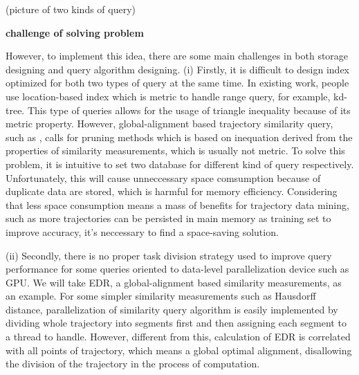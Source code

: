 \documentclass[conference]{IEEEtran}
\begin{document}
		(picture of two kinds of query)
	
	
\textbf{challenge of solving problem}


	
	However, to implement this idea, there are some main challenges in both storage designing and query algorithm designing.
	(i) Firstly, it is difficult to design index optimized for both two types of query at the same time. In existing work, people use location-based index which is metric to handle range query, for example, kd-tree. This type of queries allows for the usage of triangle inequality because of its metric property. However, global-alignment based trajectory similarity query, such as \cite{DBLP:conf/sigmod/ChenOO05}, calls for pruning methods which is based on inequation derived from the properties of similarity measurements, which is usually not metric.
	To solve this problem, it is intuitive to set two database for different kind of query respectively. Unfortunately, this will cause unneccessary space comsumption because of duplicate data are stored, which is harmful for memory efficiency. Considering that less space consumption means a mass of benefits for trajectory data mining, such as more trajectories can be persisted in main memory as training set to improve accuracy, it's neccessary to find a space-saving solution.
	
	(ii) Secondly, there is no proper task division strategy used to improve query performance for some queries oriented to data-level parallelization device such as GPU. We will take EDR, a global-alignment based similarity measurements, as an example. For some simpler similarity measurements such as Hausdorff distance\cite{DBLP:conf/bigdataconf/LealGZY15}, parallelization of similarity query algorithm is easily implemented by dividing whole trajectory into segments first and then assigning each segment to a thread to handle.\cite{DBLP:conf/bigdataconf/LealGZY15} However, different from this, calculation of EDR is correlated with all points of trajectory, which means a global optimal alignment, disallowing the division of the trajectory in the process of computation. 
	
\end{document}
